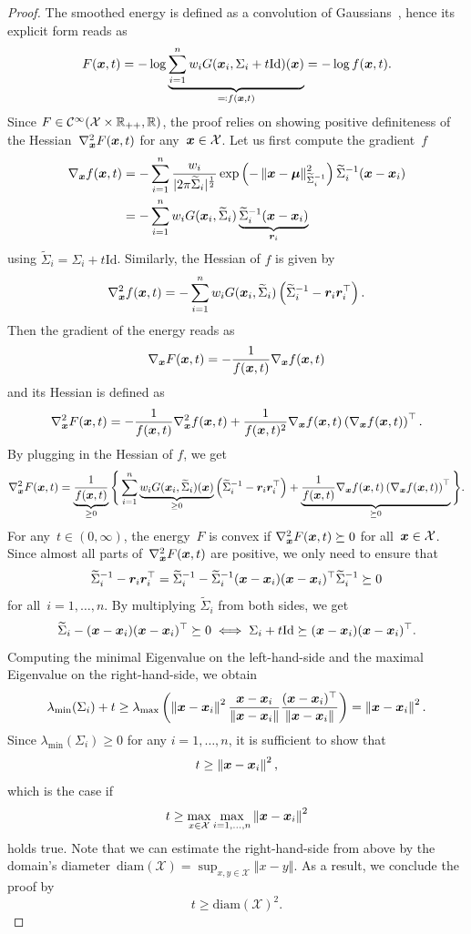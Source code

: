 \documentclass{article}
\newcommand{\C}{\mathcal{C}}
\newcommand{\X}{\mathcal{X}}
\newcommand{\id}{\mathrm{Id}}
\newcommand{\norm}[1]{\left\Vert#1\right\Vert}
\newcommand{\diameter}{\mathrm{diam}}
\theoremstyle{plain}
\theoremstyle{definition}
\theoremstyle{remark}
\begin{document}
\begin{proof}
The smoothed energy is defined as a convolution of Gaussians~\citep{Du19}, hence its explicit form reads as
\begin{align} \label{eq:fgmm}
F(\vx,t) = -\log \underbrace{\sum_{i=1}^n w_i G(\vx_i,\Sigma_i+t\id)(\vx)}_{\eqqcolon f(\vx,t)} = -\log f(\vx,t).
\end{align}
Since $F\in\C^{\infty}(\X\times \R_{++}, \R)$, the proof relies on showing positive definiteness of the Hessian~$\nabla_{\bm{x}}^2 F({\bm{x}},t)$ for any~$\vx\in\X$.
Let us first compute the gradient~$f$
\begin{align*}
\nabla_\vx f(\vx,t) &= 
-\sum_{i=1}^n \frac{w_i}{\vert 2\pi\widetilde{\Sigma}_i\vert^{\frac{1}{2}}} \exp\left(-\norm{\vx-\bm{\mu}}_{\widetilde{\Sigma}_i^{-1}}^2\right) \widetilde{\Sigma}_i^{-1} (\vx-\vx_i)\\
&= -\sum_{i=1}^n w_i G(\vx_i,\widetilde{\Sigma}_i) \underbrace{\widetilde{\Sigma}_i^{-1} (\vx-\vx_i)}_{\vr_i}
\end{align*}
using $\widetilde{\Sigma}_i = \Sigma_i+t\id$.
Similarly, the Hessian of $f$ is given by
\[
\nabla_{\bm{x}}^2 f({\bm{x}},t) = -\sum_{i=1}^n w_i G({\bm{x}}_i,\widetilde{\Sigma}_i)\left(\widetilde{\Sigma}_i^{-1} -  {\bm{r}}_i{\bm{r}}_i^\top\right).
\]
Then the gradient of the energy reads as
\[
\nabla_{\bm{x}} F({\bm{x}}, t) = -\frac{1}{f({\bm{x}},t)} \nabla_{\bm{x}} f({\bm{x}},t)
\]
and its Hessian is defined as
\[
\nabla_{\bm{x}}^2 F({\bm{x}}, t) =
-\frac{1}{f({\bm{x}},t)} \nabla_{\bm{x}}^2 f({\bm{x}}, t) + \frac{1}{f({\bm{x}},t)^2} \nabla_{\bm{x}} f({\bm{x}},t) \left(\nabla_{\bm{x}} f({\bm{x}},t)\right)^\top.
\]
By plugging in the Hessian of $f$, we get
\[
\nabla_{\bm{x}}^2 F({\bm{x}}, t) = \underbrace{\frac{1}{f({\bm{x}},t)}}_{\geq0}\Bigg\{\sum_{i=1}^n \underbrace{w_i G({\bm{x}}_i,\widetilde{\Sigma}_i)({\bm{x}})}_{\geq0} \left( \widetilde{\Sigma}_i^{-1} - {\bm{r}}_i{\bm{r}}_i^\top  \right) + \underbrace{\frac{1}{f({\bm{x}},t)} \nabla_{\bm{x}} f({\bm{x}},t) \left(\nabla_{\bm{x}} f({\bm{x}},t)\right)^\top}_{\succeq 0} \Bigg\}.
\]
For any~$t\in(0,\infty)$, the energy~$F$ is convex if $\nabla_{\bm{x}}^2 F({\bm{x}}, t)\succeq0$ for all~$\vx\in\X$.
Since almost all parts of~$\nabla_{\bm{x}}^2 F({\bm{x}}, t)$ are positive, we only need to ensure that
\[
\widetilde{\Sigma}_i^{-1} - {\bm{r}}_i{\bm{r}}_i^\top = \widetilde{\Sigma}_i^{-1} - \widetilde{\Sigma}_i^{-1} ({\bm{x}}-{\bm{x}}_i)({\bm{x}}-{\bm{x}}_i)^\top \widetilde{\Sigma}_i^{-1} \succeq 0
\]
for all~$i=1,\ldots,n$.
By multiplying $\widetilde{\Sigma}_i$ from both sides, we get
\[
\widetilde{\Sigma}_i - (\vx-\vx_i)(\vx-\vx_i)^\top \succeq 0 \iff \Sigma_i + t\id \succeq (\vx-\vx_i)(\vx-\vx_i)^\top.
\]
Computing the minimal Eigenvalue on the left-hand-side and the maximal Eigenvalue on the right-hand-side, we obtain
\[
\lambda_\mathrm{min}(\Sigma_i) + t \geq \lambda_\mathrm{max}\left(\norm{\vx-\vx_i}^2 \frac{\vx-\vx_i}{\norm{\vx-\vx_i}}\frac{(\vx-\vx_i)^\top}{\norm{\vx-\vx_i}}\right) = \norm{\vx-\vx_i}^2.
\]
Since $\lambda_\mathrm{min}(\Sigma_i)\geq0$ for any $i=1,\ldots,n$, it is sufficient to show that
\[
t\geq \norm{\vx-\vx_i}^2,
\]
which is the case if 
\[
t\geq \max_{x\in\X}\max_{i=1,\ldots,n} \norm{\vx-\vx_i}^2
\]
holds true.
Note that we can estimate the right-hand-side from above by the domain's diameter~$\diameter(\X)=\sup_{x,y\in\X}\norm{x-y}$.
As a result, we conclude the proof by
\[
t\geq \diameter(\X)^2.
\]
\end{proof}
\end{document}

